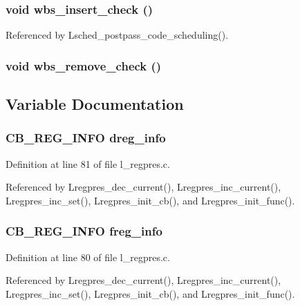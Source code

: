 \subsubsection{\setlength{\rightskip}{0pt plus 5cm}void wbs\_\-insert\_\-check ()}\label{l__schedule_8h_19312afbfe319ab758c890296a576863}




Referenced by Lsched\_\-postpass\_\-code\_\-scheduling().
\subsubsection{\setlength{\rightskip}{0pt plus 5cm}void wbs\_\-remove\_\-check ()}\label{l__schedule_8h_03ec5813b6f4f103e78129a38f37805b}




\subsection{Variable Documentation}
\subsubsection{\setlength{\rightskip}{0pt plus 5cm}\bf{CB\_\-REG\_\-INFO} \bf{dreg\_\-info}}\label{l__schedule_8h_3c2afab1c79a0e20251f42283e7ad216}




Definition at line 81 of file l\_\-regpres.c.

Referenced by Lregpres\_\-dec\_\-current(), Lregpres\_\-inc\_\-current(), Lregpres\_\-inc\_\-set(), Lregpres\_\-init\_\-cb(), and Lregpres\_\-init\_\-func().
\subsubsection{\setlength{\rightskip}{0pt plus 5cm}\bf{CB\_\-REG\_\-INFO} \bf{freg\_\-info}}\label{l__schedule_8h_360b283a865b12acd3078199a40caafd}




Definition at line 80 of file l\_\-regpres.c.

Referenced by Lregpres\_\-dec\_\-current(), Lregpres\_\-inc\_\-current(), Lregpres\_\-inc\_\-set(), Lregpres\_\-init\_\-cb(), and Lregpres\_\-init\_\-func().

